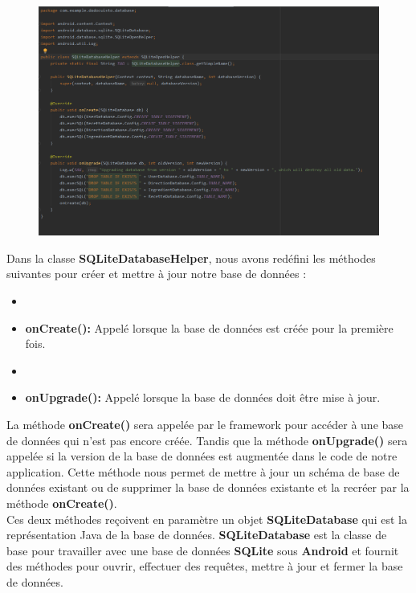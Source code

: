 \documentclass{article}
\begin{document}
\begin{figure}
    \center
    \includegraphics[scale=0.5]{sqlhelper.png}
\end{figure}

Dans la classe \textbf{SQLiteDatabaseHelper}, nous avons redéfini les méthodes suivantes pour créer et mettre à jour notre base de données :
\begin{itemize}
    \item \item \textbf{onCreate():} Appelé lorsque la base de données est créée pour la première fois.
    \item \item \textbf{onUpgrade():} Appelé lorsque la base de données doit être mise à jour.\\
\end{itemize}

La méthode \textbf{onCreate()} sera appelée par le framework pour accéder à une base de données qui n'est pas encore créée. Tandis que la méthode \textbf{onUpgrade()} sera appelée si la version de la base de données est augmentée dans le code de notre application. Cette méthode nous permet de mettre à jour un schéma de base de données existant ou de supprimer la base de données existante et la recréer par la méthode \textbf{onCreate()}.\\

Ces deux méthodes reçoivent en paramètre un objet \textbf{SQLiteDatabase} qui est la représentation Java de la base de données.
\textbf{SQLiteDatabase} est la classe de base pour travailler avec une base de données \textbf{SQLite} sous \textbf{Android} et fournit des méthodes pour ouvrir, effectuer des requêtes, mettre à jour et fermer la base de données.\\
\end{document}
